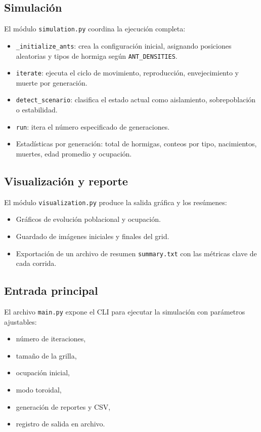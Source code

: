 \documentclass[12pt,a4paper]{article}
\begin{document}
\subsection{Simulación}
El módulo \texttt{simulation.py} coordina la ejecución completa:
\begin{itemize}
  \item \texttt{_initialize_ants}: crea la configuración inicial, asignando posiciones aleatorias y tipos de hormiga según \texttt{ANT_DENSITIES}.
  \item \texttt{iterate}: ejecuta el ciclo de movimiento, reproducción, envejecimiento y muerte por generación.
  \item \texttt{detect_scenario}: clasifica el estado actual como aislamiento, sobrepoblación o estabilidad.
  \item \texttt{run}: itera el número especificado de generaciones.
  \item Estadísticas por generación: total de hormigas, conteos por tipo, nacimientos, muertes, edad promedio y ocupación.
\end{itemize}

\subsection{Visualización y reporte}
El módulo \texttt{visualization.py} produce la salida gráfica y los resúmenes:
\begin{itemize}
  \item Gráficos de evolución poblacional y ocupación.
  \item Guardado de imágenes iniciales y finales del grid.
  \item Exportación de un archivo de resumen \texttt{summary.txt} con las métricas clave de cada corrida.
\end{itemize}

\subsection{Entrada principal}
El archivo \texttt{main.py} expone el CLI para ejecutar la simulación con parámetros ajustables:
\begin{itemize}
  \item número de iteraciones,
  \item tamaño de la grilla,
  \item ocupación inicial,
  \item modo toroidal,
  \item generación de reportes y CSV,
  \item registro de salida en archivo.
\end{itemize}
\end{document}
